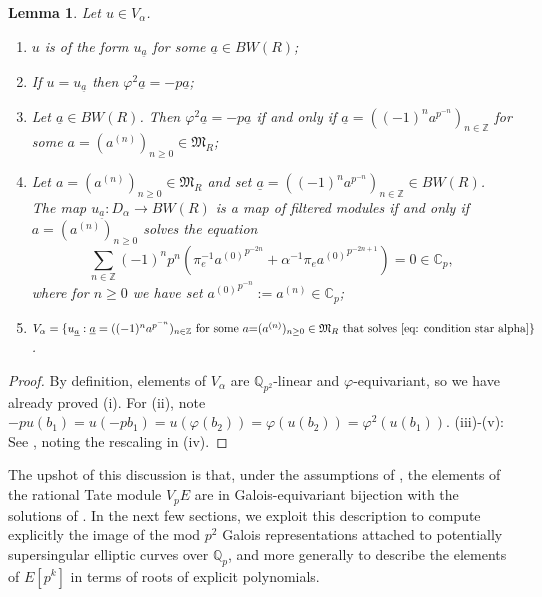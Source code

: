 \documentclass{amsart}
\newtheorem{lemma}[theorem]{Lemma}
\theoremstyle{definition}
\newcommand{\Q}{\mathbb{Q}}
\newcommand{\Dbasis}{b}
\numberwithin{theorem}{section}
\numberwithin{equation}{section}
\begin{document}
\begin{lemma}\label{lem: V_alpha}
Let $u \in V_\alpha$.
\begin{enumerate}
    \item $u$ is of the form $u_{\underline{a}}$ for some $\underline{a} \in BW(R)$;
    \item If $u=u_{\underline{a}}$ then $\varphi^2\underline{a}=-p\underline{a}$;
    \item Let $\underline{a} \in BW(R)$. Then $\varphi^2\underline{a}=-p\underline{a}$ if and only if $\underline{a}=((-1)^na^{p^{-n}})_{n \in \mathbb{Z}}$ for some $a=(a^{(n)})_{n \geq 0} \in \mathfrak{M}_R$;
    \item Let $a=(a^{(n)})_{n \geq 0} \in \mathfrak{M}_R$ and set $\underline{a}=((-1)^na^{p^{-n}})_{n \in \mathbb{Z}} \in BW(R)$. The map $u_{\underline{a}} : D_\alpha \to BW(R)$ is a map of filtered modules if and only if $a=(a^{(n)})_{n \geq 0}$ solves the equation
    \begin{equation}\label{eq: condition star alpha}
        \sum_{n \in \mathbb{Z}} (-1)^n p^n\left( \pi_e^{-1} {a^{(0)}}^{p^{-2n}} + \alpha^{-1}\pi_e {a^{(0)}}^{p^{-2n+1}} \right) = 0 \in \mathbb{C}_p,
    \end{equation}
    where for $n \geq 0$ we have set ${a^{(0)}}^{p^{-n}}:=a^{(n)} \in \mathbb{C}_p$;
    \item $V_\alpha = \{ u_{\underline{a}} :  \underline{a}=((-1)^na^{p^{-n}})_{n \in \mathbb{Z}} \text{ for some } a{=}(a^{(n)})_{n \geq 0} \in \mathfrak{M}_R \text{ that solves } \Cref{eq: condition star alpha} \}$.
\end{enumerate}
\end{lemma}

\begin{proof}
By definition, elements of $V_\alpha$ are $\Q_{p^2}$-linear and $\varphi$-equivariant, so we have already proved (i). For (ii),  note $-pu(\Dbasis_1)=u(-p\Dbasis_1)=u(\varphi(\Dbasis_2))=\varphi(u(\Dbasis_2))=\varphi^2(u(\Dbasis_1))$.
(iii)-(v): See \cite[p.~125]{Volkov}, noting the rescaling in (iv).
\end{proof}



The upshot of this discussion is that, under the assumptions of , the elements of the rational Tate module $V_pE$ are in Galois-equivariant bijection with the solutions of . In the next few sections, we exploit this description to compute explicitly the image of the mod $p^2$ Galois representations attached to potentially supersingular elliptic curves over $\Q_p$, and more generally to describe the elements of $E[p^k]$ in terms of roots of explicit polynomials.
\end{document}
